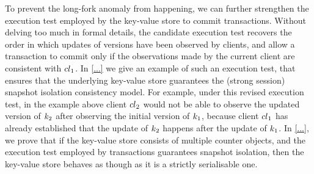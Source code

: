 To prevent the long-fork anomaly from happening, we can further strengthen the 
execution test employed by the key-value store to commit transactions. Without delving 
too much in formal details, the candidate execution test recovers the order in which 
updates of versions have been observed by clients, and allow a transaction to commit 
only if the observations made  by the current client are consistent with ${cl}_1$. In \cref{...} 
we give an example of such an execution test, that ensures that the underlying key-value 
store guarantees the (strong session) snapshot isolation consistency model. For example, 
under this revised execution test, in the example above client ${cl}_2$ would not be able 
to observe the updated version of $k_2$ after observing the initial version of $k_1$, 
because client ${cl}_1$ has already established that the update of $k_2$ happens after 
the update of $k_1$. In \cref{...}, we prove that  if the key-value store 
consists of multiple counter objects, and the execution test employed by transactions 
guarantees snapshot isolation, then the key-value store behaves as though as it is 
a strictly serialisable one.
%
%
